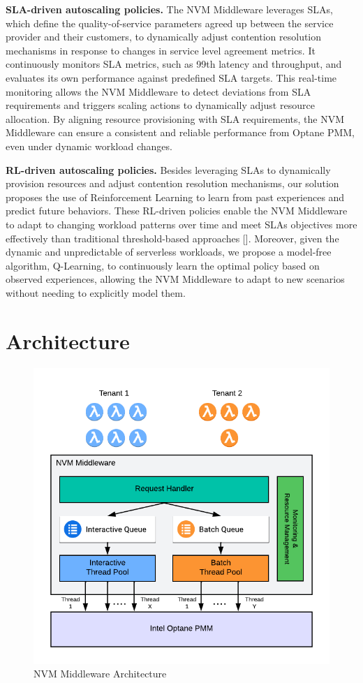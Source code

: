 \textbf{SLA-driven autoscaling policies.} The NVM Middleware leverages SLAs, which define the quality-of-service parameters agreed up between the service provider and their customers, to dynamically adjust contention resolution mechanisms in response to changes in service level agreement metrics. It continuously monitors SLA metrics, such as 99th latency and throughput, and evaluates its own performance against predefined SLA targets. This real-time monitoring allows the NVM Middleware to detect deviations from SLA requirements and triggers scaling actions to dynamically adjust resource allocation. By aligning resource provisioning with SLA requirements, the NVM Middleware can ensure a consistent and reliable performance from Optane PMM, even under dynamic workload changes.

\textbf{RL-driven autoscaling policies.} Besides leveraging SLAs to dynamically provision resources and adjust contention resolution mechanisms, our solution proposes the use of Reinforcement Learning to learn from past experiences and predict future behaviors.  These RL-driven policies enable the NVM Middleware to adapt to changing workload patterns over time and meet SLAs objectives more effectively than traditional threshold-based approaches []. Moreover, given the dynamic and unpredictable of serverless workloads, we propose a model-free algorithm, Q-Learning, to continuously learn the optimal policy based on observed experiences, allowing the NVM Middleware to adapt to new scenarios without needing to explicitly model them.

\section{Architecture}

\begin{figure}[ht]
  \centering
  \label{images:nvm_architecture}
  \includegraphics[scale=0.8]{images/nvm_design.png}
  \caption[NVM Middleware Architecture]{NVM Middleware Architecture}
\end{figure}

